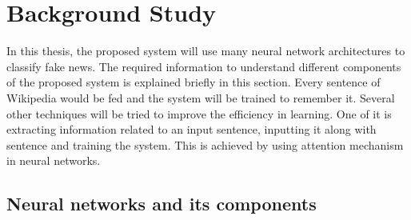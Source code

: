 \documentclass[a4paper, 11pt]{article}
\begin{document}

  





\section{Background Study}

In this thesis, the proposed system will use many neural network architectures to classify fake news. The required information to understand different components of the proposed system is explained briefly in this section. Every sentence of Wikipedia would be fed and the system will be trained to remember it. Several other techniques will be tried to improve the efficiency in learning. One of it is extracting information related to an input sentence, inputting it along with sentence and training the system. This is achieved by using attention mechanism in neural networks.

\subsection{Neural networks and its components}
\end{document}

